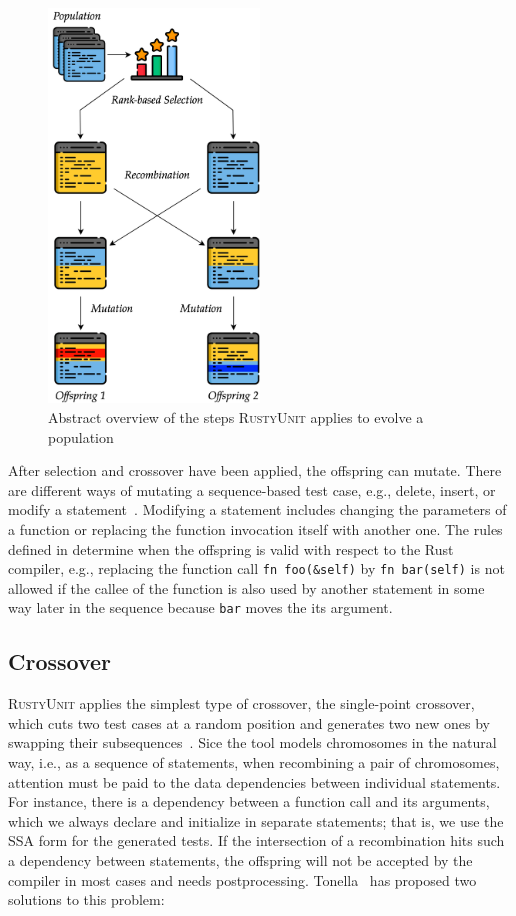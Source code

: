 \documentclass[paper=a4,%
  twoside,%
  BCOR4mm,%
  abstract=true,%
  toc=bibliography,%
  chapterprefix=true,%
  toc=bibliographynumbered,%
  open=right,%
  english,%
  pagesize=pdftex]{scrreprt}
\newcommand{\tech}{\textsc{RustyUnit}\xspace}
\begin{document}
\begin{figure}[h]
\caption{\label{fig:ga-overview}Abstract overview of the steps \tech applies to evolve a population}
\centering
\includegraphics[width=0.5\textwidth]{ga/ga-overview}
\end{figure}

After selection and crossover have been applied, the offspring can mutate. There are different ways of mutating a sequence-based test case, e.g., delete, insert, or modify a statement~\cite{Fraser2012}. Modifying a statement includes changing the parameters of a function or replacing the function invocation itself with another one. The rules defined in  determine when the offspring is valid with respect to the Rust compiler, e.g., replacing the function call \texttt{fn foo(\string&self)} by \texttt{fn bar(self)} is not allowed if the callee of the function is also used by another statement in some way later in the sequence because \texttt{bar} moves the its argument.

\subsection{Crossover}
\tech applies the simplest type of crossover, the single-point crossover, which cuts two test cases at a random position and generates two new ones by swapping their subsequences~\cite{Fraser2012}. Sice the tool models chromosomes in the natural way, i.e., as a sequence of statements, when recombining a pair of chromosomes, attention must be paid to the data dependencies between individual statements. For instance, there is a dependency between a function call and its arguments, which we always declare and initialize in separate statements; that is, we use the \ac{SSA} form for the generated tests. If the intersection of a recombination hits such a dependency between statements, the offspring will not be accepted by the compiler in most cases and needs postprocessing. Tonella~\cite{Tonella2004} has proposed two solutions to this problem:
\end{document}
